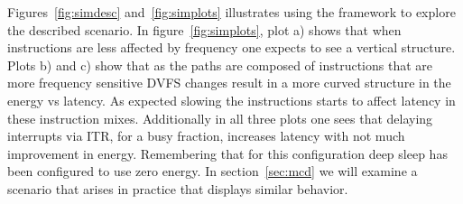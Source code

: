 Figures~\ref{fig:simdesc} and~\ref{fig:simplots} illustrates using the framework to explore the described scenario.  In figure~\ref{fig:simplots}, plot a) shows that when instructions are less affected by frequency one expects to see a vertical structure.  Plots b) and c) show that as the paths are composed of instructions that are more frequency sensitive DVFS changes result in a more curved structure in the energy vs latency.  As expected slowing the instructions starts to affect latency in these instruction mixes.   Additionally in all three plots one sees that delaying interrupts via ITR, for a busy fraction, increases latency with not much improvement in energy.  Remembering that for this configuration deep sleep has been configured to use zero energy.  In section~\ref{sec:mcd} we will examine a scenario that arises in practice that displays similar behavior. 
